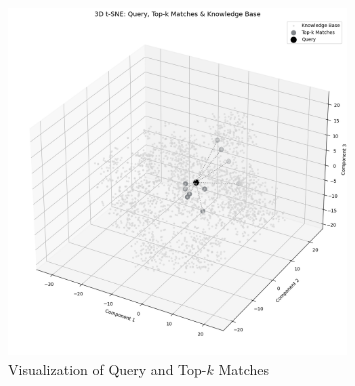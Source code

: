 \vspace{-2cm}

\pagebreak

\begin{figure}[H]
    \centering
    \includegraphics[width=0.8\textwidth]{Images/RAG_KNOWLEDGE.png}
    \vspace{-0.3cm}
    \caption{Visualization of Query and Top-\(k\) Matches}
    \label{fig:wellbeing_questions}
\end{figure}



